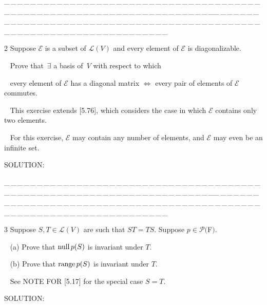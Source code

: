 \documentclass[a4paper, 11pt, UTF8]{article}
\def\range{\textup{range}\,}
\def\null{\textup{null\,}}
\def\Lm{\mathcal{L}}
\def\Po{\mathcal{P}}
\begin{document}
\begin{large}
\par
{\tiny \_\,\_\,\_\,\_\,\_\,\_\,\_\,\_\,\_\,\_\,\_\,\_\,\_\,\_\,\_\,\_\,\_\,\_\,\_\,\_\,\_\,\_\,\_\,\_\,\_\,\_\,\_\,\_\,\_\,\_\,\_\,\_\,\_\,\_\,\_\,\_\,\_\,\_\,\_\,\_\,\_\,\_\,\_\,\_\,\_\,\_\,\_\,\_\,\_\,\_\,\_\,\_\,\_\,\_\,\_\,\_\,\_\,\_\,\_\,\_\,\_\,\_\,\_\,\_\,\_\,\_\,\_\,\_\,\_\,\_\,\_\_\,\_\,\_\,\_\,\_\,\_\,\_\,\_\,\_\,\_\,\_\,\_\,\_\,\_\,\_\,\_\,\_\,\_\,\_\,\_\,\_\,\_\,\_\,\_\,\_\,\_\,\_\,\_\,\_\,\_\,\_\,\_\,\_\,\_\,\_\,\_\,\_\,\_\,\_\,\_\,\_\,\_\,\_\,\_\,\_\,\_\,\_\,\_\,\_\,\_\,\_\,\_\,\_\,\_\,\_\,\_\,\_\,\_\,\_\,\_\,\_\,\_\,\_\,\_\,\_\,\_\,\_\,\_\,\_\,\_\,\_}\par

{\timesbf\Large 2} {\timessl\Large 
Suppose $\mathcal{E}$ is a subset of $\Lm(V)$ and every element of $\mathcal{E}$ is diagonalizable.}\par\,\,\,
{\timessl\Large
Prove that $\,\exists$ a basis of \,$V$ with respect to which}\par\,\,\,
{\timessl\Large every element of $\mathcal{E}$ has a diagonal matrix $\Longleftrightarrow$ every pair of elements of $\mathcal{E}$ commutes.
}\par\,\,\,
{\timessl\small
This exercise extends [5.76], which considers the case in which $\mathcal{E}$ contains only two elements.}\par\,\,\,
{\timessl\small For this exercise, $\mathcal{E}$ may contain any number of elements,
and $\mathcal{E}$ may even be an infinite set.
}\par
{\timesbf S\footnotesize{OLUTION:}}\par\quad

\par
{\tiny \_\,\_\,\_\,\_\,\_\,\_\,\_\,\_\,\_\,\_\,\_\,\_\,\_\,\_\,\_\,\_\,\_\,\_\,\_\,\_\,\_\,\_\,\_\,\_\,\_\,\_\,\_\,\_\,\_\,\_\,\_\,\_\,\_\,\_\,\_\,\_\,\_\,\_\,\_\,\_\,\_\,\_\,\_\,\_\,\_\,\_\,\_\,\_\,\_\,\_\,\_\,\_\,\_\,\_\,\_\,\_\,\_\,\_\,\_\,\_\,\_\,\_\,\_\,\_\,\_\,\_\,\_\,\_\,\_\,\_\,\_\_\,\_\,\_\,\_\,\_\,\_\,\_\,\_\,\_\,\_\,\_\,\_\,\_\,\_\,\_\,\_\,\_\,\_\,\_\,\_\,\_\,\_\,\_\,\_\,\_\,\_\,\_\,\_\,\_\,\_\,\_\,\_\,\_\,\_\,\_\,\_\,\_\,\_\,\_\,\_\,\_\,\_\,\_\,\_\,\_\,\_\,\_\,\_\,\_\,\_\,\_\,\_\,\_\,\_\,\_\,\_\,\_\,\_\,\_\,\_\,\_\,\_\,\_\,\_\,\_\,\_\,\_\,\_\,\_\,\_\,\_}\par

{\timesbf\Large 3} {\timessl\Large 
Suppose $S, T\in\Lm(V)$ are such that $ST = TS$. Suppose $p\in\Po(${\timesbf F}$)$.
}\par\,\,\,
(a) {\timessl\Large
Prove that $\null p(S)$ is invariant under $T$.
}\par\,\,\,
(b) {\timessl\Large
Prove that $\range p(S)$ is invariant under $T$.
}\par\,\,\,
{\timessl\Large See N{\normalsize OTE} F{\normalsize OR} [5.17] for the special case $S = T$.}\par
{\timesbf S\footnotesize{OLUTION:}}\par\quad


\end{large}
\end{document}
